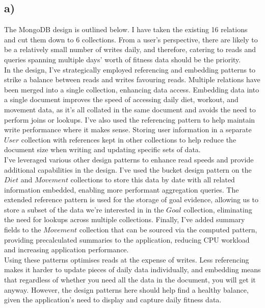 \documentclass{article}
\begin{document}
\subsection*{\small a)}
The MongoDB design is outlined below. I have taken the existing 16 relations and cut them down to 6 collections. From a user's perspective, there are likely to be a relatively small number of writes daily, and therefore, catering to reads and queries spanning multiple days' worth of fitness data should be the priority. \\
\newline
In the design, I've strategically employed referencing and embedding patterns to strike a balance between reads and writes favouring reads. Multiple relations have been merged into a single collection, enhancing data access. Embedding data into a single document improves the speed of accessing daily diet, workout, and movement data, as it's all collated in the same document and avoids the need to perform joins or lookups. I've also used the referencing pattern to help maintain write performance where it makes sense. Storing user information in a separate $User$ collection with references kept in other collections to help reduce the document size when writing and updating specific sets of data. \\
\newline
I've leveraged various other design patterns to enhance read speeds and provide additional capabilities in the design. I've used the bucket design pattern on the $Diet$ and $Movement$ collections to store this data by date with all related information embedded, enabling more performant aggregation queries. The extended reference pattern is used for the storage of goal evidence, allowing us to store a subset of the data we're interested in in the $Goal$ collection, eliminating the need for lookups across multiple collections. Finally, I've added summary fields to the $Movement$ collection that can be sourced via the computed pattern, providing precalculated summaries to the application, reducing CPU workload and increasing application performance. \\
\newline
Using these patterns optimises reads at the expense of writes. Less referencing makes it harder to update pieces of daily data individually, and embedding means that regardless of whether you need all the data in the document, you will get it anyway. However, the design patterns here should help find a healthy balance, given the application's need to display and capture daily fitness data. \\
\end{document}
